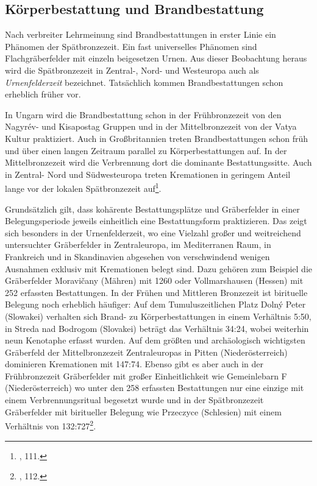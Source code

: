 \documentclass[openany,twoside,twocolumn]{book}
\let\rmarkdownfootnote\footnote%
\def\footnote{\protect\rmarkdownfootnote}
\begin{document}
\hypertarget{korperbestattung-und-brandbestattung}{%
\subsection{Körperbestattung und
Brandbestattung}\label{korperbestattung-und-brandbestattung}}

Nach verbreiter Lehrmeinung sind Brandbestattungen in erster Linie ein
Phänomen der Spätbronzezeit. Ein fast universelles Phänomen sind
Flachgräberfelder mit einzeln beigesetzen Urnen. Aus dieser Beobachtung
heraus wird die Spätbronzezeit in Zentral-, Nord- und Westeuropa auch
als \emph{Urnenfelderzeit} bezeichnet. Tatsächlich kommen
Brandbestattungen schon erheblich früher vor.

In Ungarn wird die Brandbestattung schon in der Frühbronzezeit von den
Nagyrév- und Kisapostag Gruppen und in der Mittelbronzezeit von der
Vatya Kultur praktiziert. Auch in Großbritannien treten
Brandbestattungen schon früh und über einen langen Zeitraum parallel zu
Körperbestattungen auf. In der Mittelbronzezeit wird die Verbrennung
dort die dominante Bestattungssitte. Auch in Zentral- Nord und
Südwesteuropa treten Kremationen in geringem Anteil lange vor der
lokalen Spätbronzezeit auf\footnote{\textcite{harding_european_2000},
  111.}.

Grundsätzlich gilt, dass kohärente Bestattungsplätze und Gräberfelder in
einer Belegungsperiode jeweils einheitlich eine Bestattungsform
praktizieren. Das zeigt sich besonders in der Urnenfelderzeit, wo eine
Vielzahl großer und weitreichend untersuchter Gräberfelder in
Zentraleuropa, im Mediterranen Raum, in Frankreich und in Skandinavien
abgesehen von verschwindend wenigen Ausnahmen exklusiv mit Kremationen
belegt sind. Dazu gehören zum Beispiel die Gräberfelder Moravičany
(Mähren) mit 1260 oder Vollmarshausen (Hessen) mit 252 erfassten
Bestattungen. In der Frühen und Mittleren Bronzezeit ist birituelle
Belegung noch erheblich häufiger: Auf dem Tumuluszeitlichen Platz Dolný
Peter (Slowakei) verhalten sich Brand- zu Körperbestattungen in einem
Verhältnis 5:50, in Streda nad Bodrogom (Slovakei) beträgt das
Verhältnis 34:24, wobei weiterhin neun Kenotaphe erfasst wurden. Auf dem
größten und archäologisch wichtigsten Gräberfeld der Mittelbronzezeit
Zentraleuropas in Pitten (Niederösterreich) dominieren Kremationen mit
147:74. Ebenso gibt es aber auch in der Frühbronzezeit Gräberfelder mit
großer Einheitlichkeit wie Gemeinlebarn F (Niederösterreich) wo unter
den 258 erfassten Bestattungen nur eine einzige mit einem
Verbrennungsritual begesetzt wurde und in der Spätbronzezeit
Gräberfelder mit biritueller Belegung wie Przeczyce (Schlesien) mit
einem Verhältnis von 132:727\footnote{\textcite{harding_european_2000},
  112.}.
\end{document}
